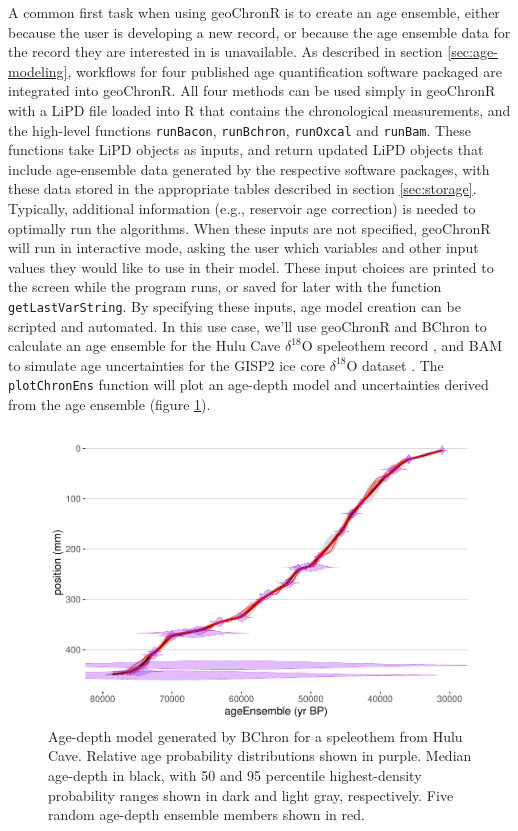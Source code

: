 \documentclass[gchron, manuscript]{copernicus}
\begin{document}
A common first task when using geoChronR is to create an age ensemble, either because the user is developing a new record, or because the age ensemble data for the record they are interested in is unavailable.
As described in section \ref{sec:age-modeling}, workflows for four published age quantification software packaged are integrated into geoChronR.
All four methods can be used simply in geoChronR with a LiPD file loaded into R that contains the chronological measurements, and the high-level functions \texttt{runBacon}, \texttt{runBchron}, \texttt{runOxcal} and \texttt{runBam}.
These functions take LiPD objects as inputs, and return updated LiPD objects that include age-ensemble data generated by the respective software packages, with these data stored in the appropriate tables described in section \ref{sec:storage}.
Typically, additional information (e.g., reservoir age correction) is needed to optimally run the algorithms.
When these inputs are not specified, geoChronR will run in interactive mode, asking the user which variables and other input values they would like to use in their model.
These input choices are printed to the screen while the program runs, or saved for later with the function \texttt{getLastVarString}.
By specifying these inputs, age model creation can be scripted and automated.
In this use case, we'll use geoChronR and BChron \citep{parnell2008flexible} to calculate an age ensemble for the Hulu Cave \(\delta^{18}\)O speleothem record \citep{hulu2001}, and BAM \citep{BAM} to simulate age uncertainties for the GISP2 ice core \(\delta^{18}\)O dataset \citep{alley2000}.
The \texttt{plotChronEns} function will plot an age-depth model and uncertainties derived from the age ensemble (figure \ref{fig:age-model}).

\begin{figure}
\includegraphics[width=12cm]{geoChronR-paper_files/figure-latex/age-model-1} \caption{Age-depth model generated by BChron for a speleothem from Hulu Cave. Relative age probability distributions shown in purple. Median age-depth in black, with 50 and 95 percentile highest-density probability ranges shown in dark and light gray, respectively. Five random age-depth ensemble members shown in red.}\label{fig:age-model}
\end{figure}
\end{document}
